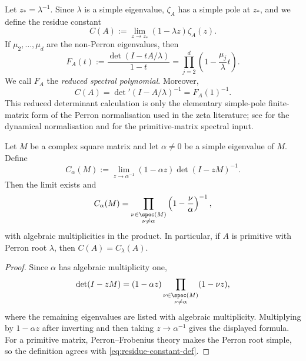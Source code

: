 Let \(z_\ast=\lambda^{-1}\). Since \(\lambda\) is a simple eigenvalue,
\(\zeta_A\) has a simple pole at \(z_\ast\), and we define the residue
constant
\begin{equation}\label{eq:residue-constant-def}
  C(A):=\lim_{z\to z_\ast}(1-\lambda z)\zeta_A(z).
\end{equation}
If \(\mu_2,\dots,\mu_d\) are the non-Perron eigenvalues, then
\begin{equation}\label{eq:reduced-det-poly}
  F_A(t):=\frac{\det(I-tA/\lambda)}{1-t}
  =\prod_{j=2}^d\left(1-\frac{\mu_j}{\lambda}t\right).
\end{equation}
We call \(F_A\) the \emph{reduced spectral polynomial}. Moreover,
\begin{equation}\label{eq:reduced-det-constant}
  C(A)=\det\nolimits'(I-A/\lambda)^{-1}=F_A(1)^{-1}.
\end{equation}
This reduced determinant calculation is only the elementary simple-pole
finite-matrix form of the Perron normalisation used in the zeta literature;
see \cite{ParryPollicott1990Zeta} for the dynamical normalisation and
\cite{Seneta2006NonnegativeMatrices} for the primitive-matrix spectral input.

\begin{lemma}
  \label{lem:simple-eigenvalue-reduced-constant}
  Let \(M\) be a complex square matrix and let
  \(\alpha\neq 0\) be a simple eigenvalue of \(M\). Define
  \[
    C_\alpha(M)
    :=\lim_{z\to \alpha^{-1}}
      (1-\alpha z)\det(I-zM)^{-1}.
  \]
  Then the limit exists and
  \[
    C_\alpha(M)
    =
    \prod_{\substack{\nu\in\spec(M)\\ \nu\neq\alpha}}
      \left(1-\frac{\nu}{\alpha}\right)^{-1},
  \]
  with algebraic multiplicities in the product. In particular, if \(A\)
  is primitive with Perron root \(\lambda\), then
  \(C(A)=C_\lambda(A)\).
\end{lemma}

\begin{proof}
  Since \(\alpha\) has algebraic multiplicity one,
  \[
    \det(I-zM)
    =(1-\alpha z)
      \prod_{\substack{\nu\in\spec(M)\\ \nu\neq\alpha}}(1-\nu z),
  \]
  where the remaining eigenvalues are listed with algebraic
  multiplicity. Multiplying by \(1-\alpha z\) after inverting and then
  taking \(z\to \alpha^{-1}\) gives the displayed formula. For a
  primitive matrix, Perron--Frobenius theory
  \cite{Seneta2006NonnegativeMatrices} makes the Perron root simple, so the
  definition agrees with \eqref{eq:residue-constant-def}.
\end{proof}

